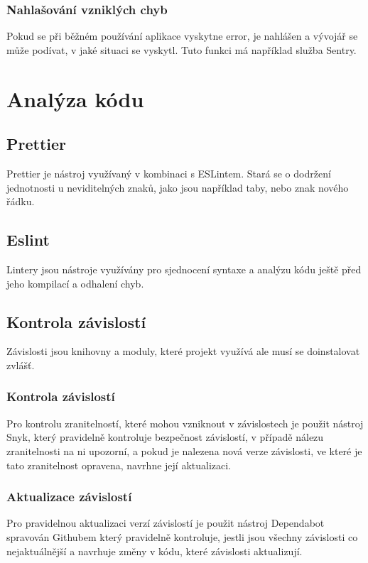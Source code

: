 \subsubsection{Nahlašování vzniklých chyb}
Pokud se při běžném používání aplikace vyskytne error, je nahlášen a 
vývojář se může podívat, v jaké situaci se vyskytl. Tuto funkci má například
služba Sentry.
\section{Analýza kódu}  
\subsection{Prettier}
Prettier je nástroj využívaný v kombinaci s ESLintem. Stará
se o dodržení jednotnosti u neviditelných znaků,
jako jsou například taby, nebo znak nového řádku.
\subsection{Eslint}
Lintery jsou nástroje využívány pro sjednocení syntaxe a 
analýzu kódu ještě před jeho kompilací
a odhalení chyb.
\subsection{Kontrola závislostí}
Závislosti jsou knihovny a moduly, které projekt využívá 
ale musí se doinstalovat zvlášť.
\subsubsection{Kontrola závislostí}
Pro kontrolu zranitelností, které mohou vzniknout v závislostech je 
použit nástroj Snyk, který pravidelně kontroluje bezpečnost závislostí,
v případě nálezu zranitelnosti na ni upozorní, a pokud je nalezena nová
verze závislosti, ve které je tato zranitelnost opravena, navrhne její aktualizaci.
\subsubsection{Aktualizace závislostí}
Pro pravidelnou aktualizaci verzí závislostí je použit nástroj Dependabot spravován Githubem
který pravidelně kontroluje, jestli jsou všechny závislosti co nejaktuálnější
a navrhuje změny v kódu, které závislosti aktualizují.
